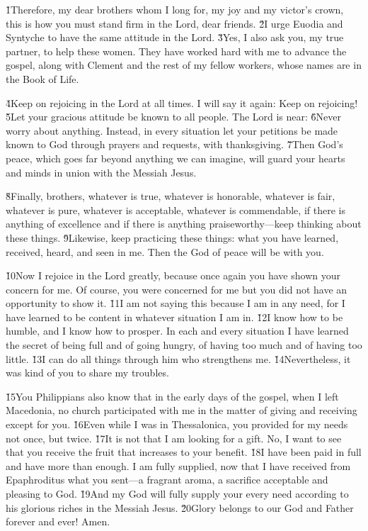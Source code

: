 \v{1}Therefore, my dear brothers whom I long for, my joy and my victor's crown, this is how you must stand firm in the Lord, dear friends. \v{2}I urge Euodia and Syntyche to have the same attitude in the Lord. \v{3}Yes, I also ask you, my true partner, to help these women. They have worked hard with me to advance the gospel, along with Clement and the rest of my fellow workers, whose names are in the Book of Life.

\v{4}Keep on rejoicing in the Lord at all times. I will say it again: Keep on rejoicing! \v{5}Let your gracious attitude be known to all people. The Lord is near: \v{6}Never worry about anything. Instead, in every situation let your petitions be made known to God through prayers and requests, with thanksgiving. \v{7}Then God's peace, which goes far beyond anything we can imagine, will guard your hearts and minds in union with the Messiah Jesus.

\v{8}Finally, brothers, whatever is true, whatever is honorable, whatever is fair, whatever is pure, whatever is acceptable, whatever is commendable, if there is anything of excellence and if there is anything praiseworthy---keep thinking about these things. \v{9}Likewise, keep practicing these things: what you have learned, received, heard, and seen in me. Then the God of peace will be with you.

\v{10}Now I rejoice in the Lord greatly, because once again you have shown your concern for me. Of course, you were concerned for me but you did not have an opportunity to show it. \v{11}I am not saying this because I am in any need, for I have learned to be content in whatever situation I am in. \v{12}I know how to be humble, and I know how to prosper. In each and every situation I have learned the secret of being full and of going hungry, of having too much and of having too little. \v{13}I can do all things through him who strengthens me. \v{14}Nevertheless, it was kind of you to share my troubles.

\v{15}You Philippians also know that in the early days of the gospel, when I left Macedonia, no church participated with me in the matter of giving and receiving except for you. \v{16}Even while I was in Thessalonica, you provided for my needs not once, but twice. \v{17}It is not that I am looking for a gift. No, I want to see that you receive the fruit that increases to your benefit. \v{18}I have been paid in full and have more than enough. I am fully supplied, now that I have received from Epaphroditus what you sent---a fragrant aroma, a sacrifice acceptable and pleasing to God. \v{19}And my God will fully supply your every need according to his glorious riches in the Messiah Jesus. \v{20}Glory belongs to our God and Father forever and ever! Amen.

